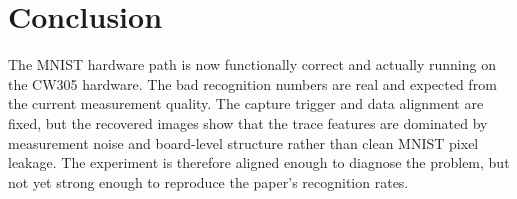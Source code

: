 \documentclass[11pt]{article}
\begin{document}
\section{Conclusion}
The MNIST hardware path is now functionally correct and actually running on the
CW305 hardware.  The bad recognition numbers are real and expected from the
current measurement quality.  The capture trigger and data alignment are fixed,
but the recovered images show that the trace features are dominated by
measurement noise and board-level structure rather than clean MNIST pixel
leakage.  The experiment is therefore aligned enough to diagnose the problem,
but not yet strong enough to reproduce the paper's recognition rates.
\end{document}
